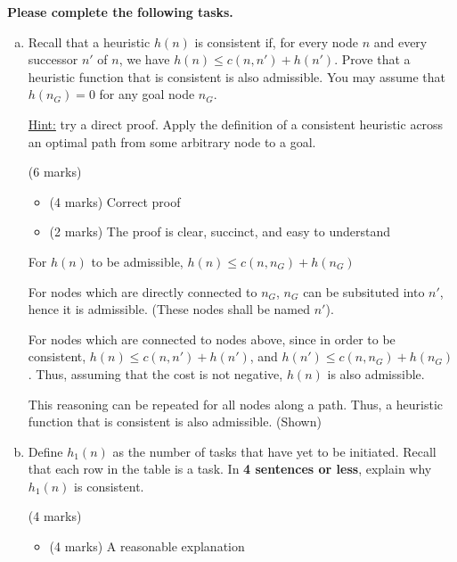 \documentclass[12pt]{article}
\begin{document}
{\bf Please complete the following tasks.}

\begin{enumerate}[(a)]

\item
\label{proof}
Recall that a heuristic $h(n)$ is consistent if, for every node $n$ and every successor $n'$ of $n$, we have $h(n) \leq c(n, n') + h(n')$. Prove that a heuristic function that is consistent is also admissible. You may assume that $h(n_G) = 0$ for any goal node $n_G$.

\underline{Hint:} try a direct proof. Apply the definition of a consistent heuristic across an optimal path from some arbitrary node to a goal.


\begin{markscheme} (6 marks)
\begin{itemize}
\item
(4 marks) Correct proof
\item
(2 marks) The proof is clear, succinct, and easy to understand
\end{itemize}

\end{markscheme}

\begin{sol}
{\color{blue} 
    For $h(n)$ to be admissible, $h(n) \leq c(n,n_G) + h(n_G)$

    For nodes which are directly connected to $n_G$, $n_G$ can be subsituted into $n'$, hence it is admissible. (These nodes shall be named $n'$).

    For nodes which are connected to nodes above, since in order to be consistent, $h(n) \leq c(n, n') + h(n')$, and $h(n') \leq c(n,n_G) + h(n_G)$. Thus, assuming that the cost is not negative, $h(n)$ is also admissible.

    This reasoning can be repeated for all nodes along a path. Thus, a heuristic function that is consistent is
    also admissible. (Shown)
    
}
\end{sol}

\item
\label{admissible-heuristic}
Define $h_1(n)$ as the number of tasks that have yet to be initiated. Recall that each row in the table is a task. In \textbf{4 sentences or less}, explain why $h_1(n)$ is consistent.

\begin{markscheme} (4 marks)
\begin{itemize}
\item
(4 marks) A reasonable explanation
\end{itemize}


\end{markscheme}
\end{enumerate}
\end{document}
